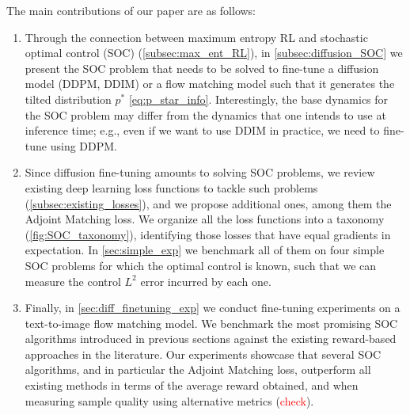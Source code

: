 \documentclass[]{fairmeta}
\begin{document}
The main contributions of our paper are as follows:
\begin{enumerate}[label=(\roman*)]
    \item Through the connection between maximum entropy RL and stochastic optimal control (SOC) (\autoref{subsec:max_ent_RL}), in \autoref{subsec:diffusion_SOC} we present the
    SOC problem that needs to be solved to fine-tune a diffusion model (DDPM, DDIM) or a flow matching model such that it generates the tilted distribution $p^*$ \eqref{eq:p_star_info}. Interestingly, the base dynamics for the SOC problem may differ from the dynamics that one intends to use at inference time; e.g., even if we want to use DDIM in practice, we need to fine-tune using DDPM.
    \item Since diffusion fine-tuning amounts to solving SOC problems, we review existing deep learning loss functions to tackle such problems (\autoref{subsec:existing_losses}), and we propose additional ones, among them the Adjoint Matching loss.
    We organize all 
    the loss functions
    into a taxonomy (\autoref{fig:SOC_taxonomy}), identifying those losses that have equal gradients in expectation. In \autoref{sec:simple_exp} we benchmark all of them on four simple SOC problems for which the optimal control is known, such that we can measure the control $L^2$ error incurred by each one. 
    \item Finally, in \autoref{sec:diff_finetuning_exp} we conduct fine-tuning experiments on a text-to-image flow matching model. We benchmark the most promising SOC algorithms introduced in previous sections against the existing reward-based %
    approaches in the literature. Our experiments showcase that several SOC algorithms, and in particular the Adjoint Matching loss, outperform all existing methods in terms of the average reward obtained, and when measuring sample quality using alternative metrics (\textcolor{red}{check}).
\end{enumerate}
\end{document}
